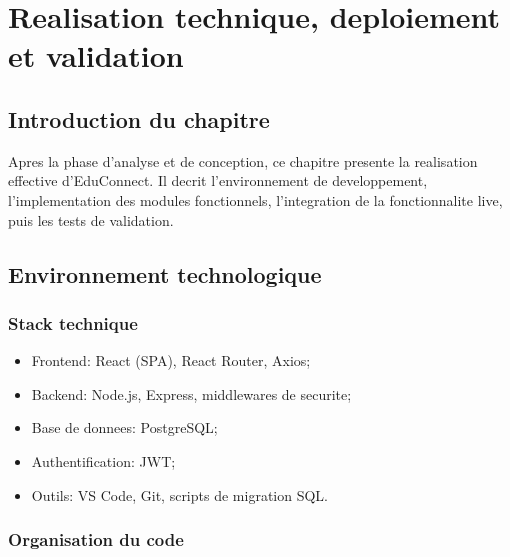 ﻿\documentclass[12pt,a4paper,oneside]{report}
\begin{document}

\chapter{Realisation technique, deploiement et validation}

\section{Introduction du chapitre}

Apres la phase d'analyse et de conception, ce chapitre presente la realisation effective d'EduConnect. Il decrit l'environnement de developpement, l'implementation des modules fonctionnels, l'integration de la fonctionnalite live, puis les tests de validation.

\section{Environnement technologique}

\subsection{Stack technique}

\begin{itemize}
  \item Frontend: React (SPA), React Router, Axios;
  \item Backend: Node.js, Express, middlewares de securite;
  \item Base de donnees: PostgreSQL;
  \item Authentification: JWT;
  \item Outils: VS Code, Git, scripts de migration SQL.
\end{itemize}

\subsection{Organisation du code}
\end{document}
